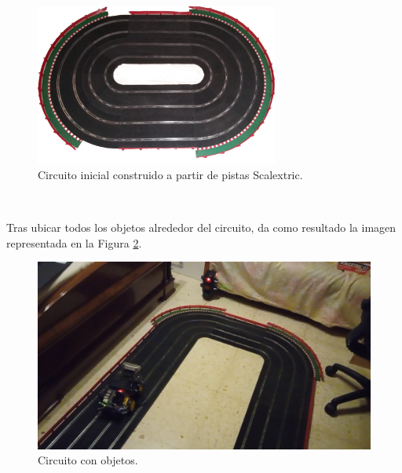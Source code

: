\begin{figure} [h!]
	\begin{center}
		\includegraphics[width=8cm]{figs/circuit}
	\end{center}
	\caption{Circuito inicial construido a partir de pistas Scalextric.}
	\label{fig:circuit}
\end{figure}\

Tras ubicar todos los objetos alrededor del circuito, da como resultado la imagen representada en la Figura \ref{fig:circuitwithobjects}.\\

\begin{figure} [h!]
	\begin{center}
		\includegraphics[width=12cm]{figs/circuitwithobjects}
	\end{center}
	\caption{Circuito con objetos.}
	\label{fig:circuitwithobjects}
\end{figure}\

